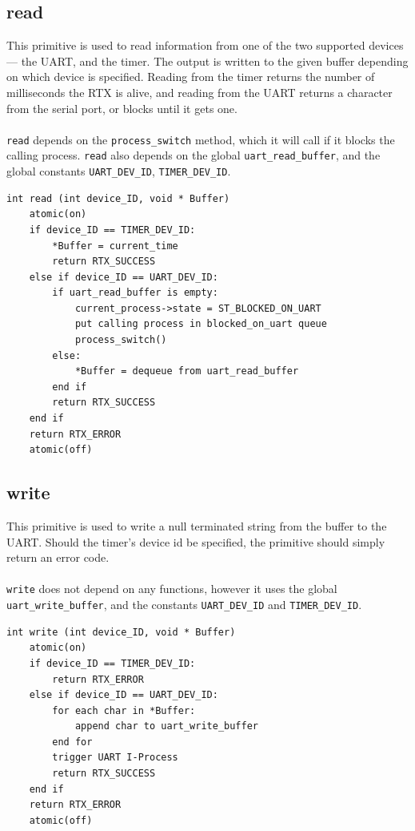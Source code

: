 \documentclass[titlepage]{article}
\begin{document}
\subsection{read}
This primitive is used to read information from one of the two supported devices
--- the UART, and the timer.  The output is written to the given buffer
depending on which device is specified.  Reading from the timer returns the
number of milliseconds the RTX is alive, and reading from the UART returns a
character from the serial port, or blocks until it gets one.\\
\\
\verb!read! depends on the \verb!process_switch! method, which it will call if
it blocks the calling process.  \verb!read! also depends on the global
\verb!uart_read_buffer!, and the global constants \verb!UART_DEV_ID!,
\verb!TIMER_DEV_ID!.

\begin{verbatim}
int read (int device_ID, void * Buffer)
    atomic(on)
    if device_ID == TIMER_DEV_ID:
        *Buffer = current_time
        return RTX_SUCCESS
    else if device_ID == UART_DEV_ID:
        if uart_read_buffer is empty:
            current_process->state = ST_BLOCKED_ON_UART
            put calling process in blocked_on_uart queue
            process_switch()
        else:
            *Buffer = dequeue from uart_read_buffer
        end if
        return RTX_SUCCESS
    end if
    return RTX_ERROR
    atomic(off)
\end{verbatim}

\subsection{write}
This primitive is used to write a null terminated string from the buffer to the
UART.  Should the timer's device id be specified, the primitive should simply
return an error code.\\
\\
\verb!write! does not depend on any functions, however it uses the global
\verb!uart_write_buffer!, and the constants \verb!UART_DEV_ID! and
\verb!TIMER_DEV_ID!.

\begin{verbatim}
int write (int device_ID, void * Buffer)
    atomic(on)
    if device_ID == TIMER_DEV_ID:
        return RTX_ERROR
    else if device_ID == UART_DEV_ID:
        for each char in *Buffer:
            append char to uart_write_buffer
        end for
        trigger UART I-Process
        return RTX_SUCCESS
    end if
    return RTX_ERROR
    atomic(off)
\end{verbatim}
\end{document}
